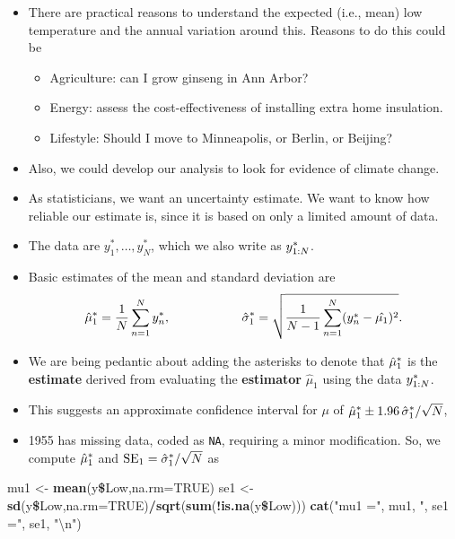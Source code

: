 \documentclass[]{article}
\newenvironment{Shaded}{\begin{snugshade}}{\end{snugshade}}
\newcommand{\KeywordTok}[1]{\textcolor[rgb]{0.13,0.29,0.53}{\textbf{#1}}}
\newcommand{\DataTypeTok}[1]{\textcolor[rgb]{0.13,0.29,0.53}{#1}}
\newcommand{\CharTok}[1]{\textcolor[rgb]{0.31,0.60,0.02}{#1}}
\newcommand{\StringTok}[1]{\textcolor[rgb]{0.31,0.60,0.02}{#1}}
\newcommand{\OtherTok}[1]{\textcolor[rgb]{0.56,0.35,0.01}{#1}}
\newcommand{\OperatorTok}[1]{\textcolor[rgb]{0.81,0.36,0.00}{\textbf{#1}}}
\newcommand{\NormalTok}[1]{#1}
\begin{document}
\begin{itemize}
\item
  There are practical reasons to understand the expected (i.e., mean)
  low temperature and the annual variation around this. Reasons to do
  this could be

  \begin{itemize}
  \item
    Agriculture: can I grow ginseng in Ann Arbor?
  \item
    Energy: assess the cost-effectiveness of installing extra home
    insulation.
  \item
    Lifestyle: Should I move to Minneapolis, or Berlin, or Beijing?
  \end{itemize}
\item
  Also, we could develop our analysis to look for evidence of climate
  change.
\item
  As statisticians, we want an uncertainty estimate. We want to know how
  reliable our estimate is, since it is based on only a limited amount
  of data.
\item
  The data are \(y^*_1,\dots,y^*_N\), which we also write as
  \(y_{1:N}^*\).
\item
  Basic estimates of the mean and standard deviation are
  \[\hat\mu_1^*= \frac{1}{N}\sum_{n=1}^Ny^*_n, \hspace{2cm}
  \hat\sigma_1^*= \sqrt{\frac{1}{N-1}\sum_{n=1}^N(y^*_n-\hat{\mu_1})^2}.\]
\item
  We are being pedantic about adding the asterisks to denote that
  \(\hat\mu_1^*\) is the \textbf{estimate} derived from
  evaluating the \textbf{estimator} \(\hat\mu_1\) using the data
  \(y_{1:N}^*\).
\item
  This suggests an approximate confidence interval for \(\mu\) of
  \(\hat\mu_1^* \pm 1.96\, \hat\sigma_1^*/\sqrt{N}\),
\item
  1955 has missing data, coded as \texttt{NA}, requiring a minor
  modification. So, we compute \(\hat\mu_1^*\) and
  \(\mathrm{SE}_1=\hat\sigma_1^*/\sqrt{N}\) as
\end{itemize}

\begin{Shaded}
\begin{Highlighting}[]
\NormalTok{mu1 <-}\StringTok{ }\KeywordTok{mean}\NormalTok{(y}\OperatorTok{\$}\NormalTok{Low,}\DataTypeTok{na.rm=}\OtherTok{TRUE}\NormalTok{)}
\NormalTok{se1 <-}\StringTok{ }\KeywordTok{sd}\NormalTok{(y}\OperatorTok{\$}\NormalTok{Low,}\DataTypeTok{na.rm=}\OtherTok{TRUE}\NormalTok{)}\OperatorTok{/}\KeywordTok{sqrt}\NormalTok{(}\KeywordTok{sum}\NormalTok{(}\OperatorTok{!}\KeywordTok{is.na}\NormalTok{(y}\OperatorTok{\$}\NormalTok{Low)))}
\KeywordTok{cat}\NormalTok{(}\StringTok{"mu1 ="}\NormalTok{, mu1, }\StringTok{",  se1 ="}\NormalTok{, se1, }\StringTok{"}\CharTok{\textbackslash{}n}\StringTok{"}\NormalTok{)}
\end{Highlighting}
\end{Shaded}
\end{document}
